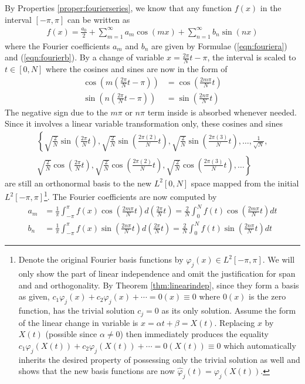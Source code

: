 By Properties \ref{proper:fourierseries}, we know that any function $f(x)$ in the interval $[-\pi, \pi]$ can be written as 
\begin{align*}
f(x) = \frac{a_0}{2} + \sum_{m=1}^{\infty} a_m \cos(mx) + \sum_{n=1}^{\infty} b_n \sin(nx) 
\end{align*} where the Fourier coefficients $a_m$ and $b_n$ are given by Formulae (\ref{eqn:fouriera}) and (\ref{eqn:fourierb}). By a change of variable $x = \frac{2\pi}{N}t - \pi$, the interval is scaled to $t \in [0, N]$ where the cosines and sines are now in the form of
\begin{align*}
\cos(m(\frac{2\pi}{N}t - \pi)) &= \cos(\frac{2m\pi}{N}t) \\
\sin(n(\frac{2\pi}{N}t - \pi)) &= \sin(\frac{2n\pi}{N}t)
\end{align*}
The negative sign due to the $m\pi$ or $n\pi$ term inside is absorbed whenever needed. Since it involves a linear variable transformation only, these cosines and sines \begin{align*}
\left\{\sqrt{\frac{2}{N}}\sin(\frac{2\pi}{N}t), \sqrt{\frac{2}{N}}\sin(\frac{2\pi(2)}{N}t), \sqrt{\frac{2}{N}}\sin(\frac{2\pi(3)}{N}t), \ldots, \frac{1}{\sqrt{N}}, \right. \\ \left. \sqrt{\frac{2}{N}}\cos(\frac{2\pi}{N}t), \sqrt{\frac{2}{N}}\cos(\frac{2\pi(2)}{N}t), \sqrt{\frac{2}{N}}\cos(\frac{2\pi(3)}{N}t), \ldots \right\}    
\end{align*} are still an orthonormal basis to the new $L^2[0, N]$ space mapped from the initial $L^2[-\pi, \pi]$\footnote{Denote the original Fourier basis functions by $\varphi_j(x) \in L^2[-\pi, \pi]$. We will only show the part of linear independence and omit the justification for span and and orthogonality. By Theorem \ref{thm:linearindep}, since they form a basis as given, $c_1\varphi_j(x) + c_2\varphi_j(x) + \cdots = 0(x) \equiv 0$ where $0(x)$ is the zero function, has the trivial solution $c_j = 0$ as its only solution. Assume the form of the linear change in variable is $x = \alpha t + \beta = X(t)$. Replacing $x$ by $X(t)$ (possible since $\alpha \neq 0$) then immediately produces the equality $c_1\varphi_j(X(t)) + c_2\varphi_j(X(t)) + \cdots = 0(X(t)) \equiv 0$ which automatically inherits the desired property of possessing only the trivial solution as well and shows that the new basis functions are now $\hat{\varphi}_j(t) = \varphi_j(X(t))$.}. The Fourier coefficients are now computed by 
\begin{align}
a_m &= \frac{1}{\pi} \int_{-\pi}^{\pi} f(x)\cos(\frac{2m\pi}{N}t) d(\frac{2\pi}{N}t) = \frac{2}{N} \int_{0}^{N} f(t)\cos(\frac{2m\pi}{N}t) dt \label{eqn:fouriersca} \\
b_n &= \frac{1}{\pi} \int_{-\pi}^{\pi} f(x)\sin(\frac{2n\pi}{N}t) d(\frac{2\pi}{N}t) = \frac{2}{N} \int_{0}^{N} f(t)\sin(\frac{2n\pi}{N}t) dt \label{eqn:fourierscb}   
\end{align}

